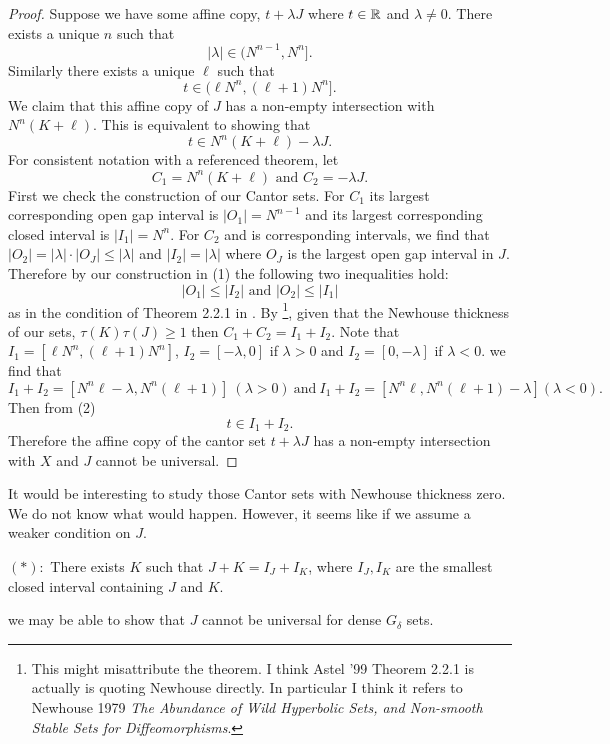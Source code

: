 \begin{proof}
Suppose we have some affine copy, $t+ \lambda J$ where $t\in\mathbb{R}$ and $\lambda\ne 0$. There exists a unique $n$ such that 
\begin{equation}
    |\lambda| \in (N^{n-1}, N^n].
\end{equation}
Similarly there exists a unique $\ell$ such that 
\begin{equation}
t \in (\ell  N^n, (\ell+1)N^n].    
\end{equation}
We claim that this affine copy of $J$ has a non-empty intersection with $N^n(K+\ell)$.  This is equivalent to  showing that 
$$t \in N^n(K+\ell)-\lambda J.$$
For consistent notation with a referenced theorem, let 
$$C_1 = N^n(K+\ell) \text{ and } C_2 = - \lambda J.$$
First we check the construction of our Cantor sets. For $C_1$ its largest corresponding open gap interval is $|O_1| = N^{n-1}$ and its largest corresponding closed interval is $|I_1| = N^n$. For $C_2$ and is corresponding intervals, we find that $|O_2| =|\lambda|\cdot |O_J| \le |\lambda|$ and $|I_2| = |\lambda|$ where $O_J$ is the largest  open gap interval in $J$.  Therefore by our construction in (1) the following two inequalities hold: $$|O_1|\leq |I_2| \text { and } |O_2| \leq |I_1|$$ as in the condition of Theorem 2.2.1 in \cite{Astels}.  By \cite [Theorem 2.2.1]{Astels}\footnote{This might misattribute the theorem.  I think Astel '99 Theorem 2.2.1 is  actually is quoting Newhouse directly.  In particular I think it refers to Newhouse 1979 \cite{PMIHES_1979__50__101_0} \textit{The Abundance of Wild Hyperbolic Sets, and Non-smooth Stable Sets for Diffeomorphisms}. }, given that the Newhouse thickness of our sets, $\tau(K)\tau(J) \geq 1$ then $C_1 + C_2 = I_1 + I_2$. Note that   $I_1 = [\ell N^n, (\ell+1)N^n]$,  $I_2=[-\lambda, 0]$ if $\lambda>0$  and $I_2=[0,-\lambda]$ if $\lambda<0$.  we find that 
$$
I_1+ I_2 = [N^n\ell - \lambda, N^n(\ell+1)] \  (\lambda>0) \ \mbox{and} \ I_1+I_2 = [N^n\ell, N^n(\ell+1)-\lambda] (\lambda<0).
$$
Then from (2)
$$t \in I_1+I_2.$$
Therefore the affine copy of the cantor set $t + \lambda J$ has a non-empty intersection with $X$ and $J$ cannot be universal.

\end{proof}

It would be interesting to study those Cantor sets with Newhouse thickness zero. We do not  know what would happen. However, it seems like if we assume a weaker condition on $J$. 

\medskip

\noindent $(\ast):$ There exists $K$ such that $J+K = I_J+I_K$, where $I_J,I_K$ are the  smallest closed interval containing $J$ and $K$. 

\medskip

we  may be able to show that  $J$  cannot be  universal for dense $G_{\delta}$ sets. 
